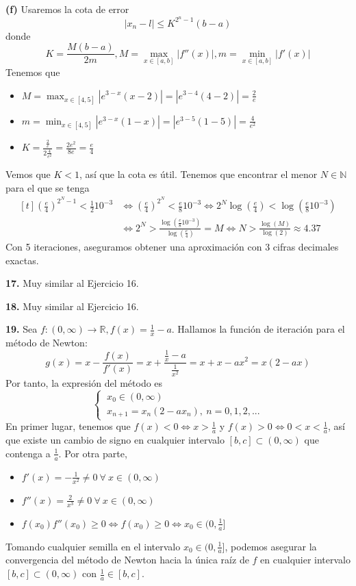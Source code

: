 \documentclass[12pt]{report}
\newcommand{\R}{\mathbb R}
\newcommand{\N}{\mathbb N}
\begin{document}
\vspace{2mm}
\textbf{(f) } Usaremos la cota de error
\[|x_n - l| \leq K^{2^n-1}(b-a)\]
donde 
\[K = \frac{M(b-a)}{2m}, M = \max_{x \in [a,b]}|f''(x)|, m = \min_{x \in [a,b]}|f'(x)|\]
Tenemos que
\begin{itemize}
    \item $\displaystyle M=\max_{x \in [4,5]}|e^{3-x}(x-2)| = |e^{3-4}(4-2)|=\frac{2}{e}$
    \item $\displaystyle m=\min_{x \in [4,5]}|e^{3-x}(1-x)| = |e^{3-5}(1-5)| = \frac{4}{e^2}$
    \item $\displaystyle K = \frac{\frac{2}{e}}{2\frac{4}{e^2}} = \frac{2e^2}{8e} = \frac{e}{4}$
\end{itemize}
Vemos que $K<1$, así que la cota es útil. Tenemos que encontrar el menor $N \in \N$ para el que se tenga 
\[
\begin{aligned}[t]
(\frac{e}{4})^{2^N-1} < \frac{1}{2}10^{-3} &\iff (\frac{e}{4})^{2^N} < \frac{e}{8}10^{-3} \iff 2^N\log(\frac{e}{4}) < \log(\frac{e}{8}10^{-3}) \\
&\iff 2^N > \frac{\log(\frac{e}{8}10^{-3})}{\log(\frac{e}{4})} = M \iff N > \frac{\log(M)}{\log(2)} \approx 4.37
\end{aligned}
\]
Con 5 iteraciones, aseguramos obtener una aproximación con 3 cifras decimales exactas.

\vspace{6mm}
\textbf{17. } Muy similar al Ejercicio 16.

\vspace{6mm}
\textbf{18. } Muy similar al Ejercicio 16.

\vspace{6mm}
\textbf{19. } Sea $f \colon (0,\infty) \to \R, f(x) = \frac{1}{x}-a$. Hallamos la función de iteración para el método de Newton:
\[g(x) = x -\frac{f(x)}{f'(x)} = x + \frac{\frac{1}{x}-a}{\frac{1}{x^2}} = x + x - ax^2 = x(2-ax)\]
Por tanto, la expresión del método es
\[
\begin{cases}
    \ x_0 \in (0,\infty) \\
    \ x_{n+1} = x_n(2-ax_n), \ n = 0,1,2,...
\end{cases}
\]
En primer lugar, tenemos que $f(x) < 0 \iff x > \frac{1}{a}$ y $f(x) > 0 \iff 0 < x < \frac{1}{a}$, así que existe un cambio de signo en cualquier intervalo $[b,c] \subset (0,\infty)$ que contenga a $\frac{1}{a}$. Por otra parte,
\begin{itemize}
    \item $\displaystyle f'(x) = -\frac{1}{x^2} \neq 0 \ \forall \ x \in (0,\infty)$
    \item $\displaystyle f''(x) = \frac{2}{x^3} \neq 0 \ \forall \ x \in (0,\infty)$
    \item $f(x_0)f''(x_0) \geq 0 \iff f(x_0) \geq 0 \iff x_0 \in (0,\frac{1}{a}]$
\end{itemize}
Tomando cualquier semilla en el intervalo $x_0 \in (0,\frac{1}{a}]$, podemos asegurar la convergencia del método de Newton hacia la única raíz de $f$ en cualquier intervalo $[b,c] \subset (0,\infty)$ con $\frac{1}{a} \in [b,c]$.
\end{document}
